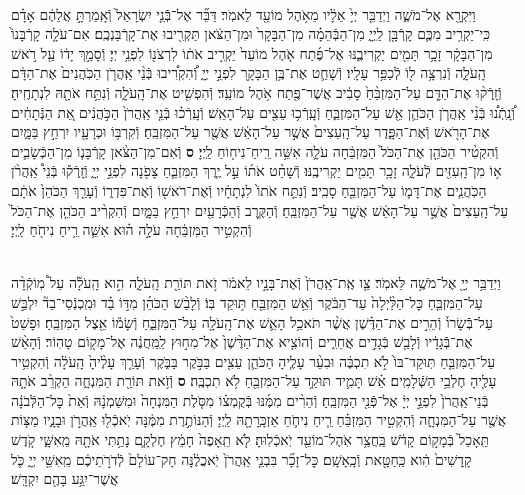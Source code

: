 \documentclass[twoside, openany, parskip=half, 11pt]{book}
\begin{document}
\begin{footnotesize}
\begin{multicols}{2}
\\
וַיִּקְרָ֖א אֶל־מֹשֶׁ֑ה וַיְדַבֵּ֤ר יְיָ֙ אֵלָ֔יו מֵאֹ֥הֶל מוֹעֵ֖ד לֵאמֹֽר׃ דַּבֵּ֞ר אֶל־בְּֿֿנֵ֤י יִשְׂרָאֵל֙ וְֿאָֽמַרְתָּ֣ אֲלֵהֶ֔ם אָדָ֗ם כִּֽי־יַקְרִ֥יב מִכֶּ֛ם קָרְֿבָּ֖ן לַֽיְיָ֑ מִן־הַבְּֿהֵמָ֗ה מִן־הַבָּקָר֙ וּמִן־הַצֹּ֔אן תַּקְרִ֖יבוּ אֶת־קָרְֿבַּנְכֶֽם׃ אִם־עֹלָ֤ה קָרְֿבָּנוֹ֙ מִן־הַבָּקָ֔ר זָכָ֥ר תָּמִ֖ים יַקְרִיבֶ֑נּוּ אֶל־פֶּ֜תַח אֹ֤הֶל מוֹעֵד֙ יַקְרִ֣יב אֹת֔וֹ לִרְצֹנ֖וֹ לִפְנֵ֥י יְיָ׃
וְֿסָמַ֣ךְ יָד֔וֹ עַ֖ל רֹ֣אשׁ הָֽעֹלָ֑ה וְֿנִרְצָ֥ה ל֖וֹ לְֿכַפֵּ֥ר עָלָֽיו׃
וְֿשָׁחַ֛ט אֶת־בֶּ֥ן הַבָּקָ֖ר לִפְנֵ֣י יְיָ֑ וְֿ֠הִקְרִ֠יבוּ בְּֿנֵ֨י אַֽהֲרֹ֤ן הַכֹּֽהֲנִים֙ אֶת־הַדָּ֔ם וְֿזָֽרְֿק֨וּ אֶת־הַדָּ֤ם עַל־הַמִּזְבֵּ֨חַ֙ סָבִ֔יב אֲשֶׁר־פֶּ֖תַח אֹ֥הֶל מוֹעֵֽד׃ וְֿהִפְשִׁ֖יט אֶת־הָֽעֹלָ֑ה וְֿנִתַּ֥ח אֹתָ֖הּ לִנְתָחֶֽיהָ׃ וְֿ֠נָֽתְֿנ֠וּ בְּֿנֵ֨י אַֽהֲרֹ֧ן הַכֹּהֵ֛ן אֵ֖שׁ עַל־הַמִּזְבֵּ֑חַ וְֿעָֽרְֿכ֥וּ עֵצִ֖ים עַל־הָאֵֽשׁ׃ וְֿעָֽרְֿכ֗וּ בְּֿנֵ֤י אַֽהֲרֹן֙ הַכֹּ֣הֲנִ֔ים אֵ֚ת הַנְּֿתָחִ֔ים אֶת־הָרֹ֖אשׁ וְֿאֶת־הַפָּ֑דֶר עַל־הָֽעֵצִים֙ אֲשֶׁ֣ר עַל־הָאֵ֔שׁ אֲשֶׁ֖ר עַל־הַמִּזְבֵּֽחַ׃ וְֿקִרְבּ֥וֹ וּכְרָעָ֖יו יִרְחַ֣ץ בַּמָּ֑יִם וְֿהִקְטִ֨יר הַכֹּהֵ֤ן אֶת־הַכֹּל֙ הַמִּזְבֵּ֔חָה עֹלָ֛ה אִשֵּׁ֥ה רֵֽיחַ־נִיח֖וֹחַ לַֽיְיָ׃ \textbf{ס}  וְֿאִם־מִן־הַצֹּ֨אן קָרְֿבָּנ֧וֹ מִן־הַכְּֿשָׂבִ֛ים א֥וֹ מִן־הָֽעִזִּ֖ים לְֿעֹלָ֑ה זָכָ֥ר תָּמִ֖ים יַקְרִיבֶֽנּוּ׃ וְֿשָׁחַ֨ט אֹת֜וֹ עַ֣ל יֶ֧רֶךְ הַמִּזְבֵּ֛חַ צָפֹ֖נָה לִפְנֵ֣י יְיָ֑ וְֿזָֽרְֿק֡וּ בְּֿנֵי֩ אַֽהֲרֹ֨ן הַכֹּֽהֲנִ֧ים אֶת־דָּמ֛וֹ עַל־הַמִּזְבֵּ֖חַ סָבִֽיב׃ וְֿנִתַּ֤ח אֹתוֹ֙ לִנְתָחָ֔יו וְֿאֶת־רֹאשׁ֖וֹ וְֿאֶת־פִּדְר֑וֹ וְֿעָרַ֤ךְ הַכֹּהֵן֙ אֹתָ֔ם עַל־הָֽעֵצִים֙ אֲשֶׁ֣ר עַל־הָאֵ֔שׁ אֲשֶׁ֖ר עַל־הַמִּזְבֵּֽחַ׃ וְֿהַקֶּ֥רֶב וְֿהַכְּֿרָעַ֖יִם יִרְחַ֣ץ בַּמָּ֑יִם וְֿהִקְרִ֨יב הַכֹּהֵ֤ן אֶת־הַכֹּל֙ וְֿהִקְטִ֣יר הַמִּזְבֵּ֔חָה עֹלָ֣ה ה֗וּא אִשֵּׁ֛ה רֵ֥יחַ נִיחֹ֖חַ לַֽיְיָ׃

\\
וַיְדַבֵּ֥ר יְיָ֖ אֶל־מֹשֶׁ֥ה לֵּאמֹֽר׃ צַ֤ו אֶֽת־אַֽהֲרֹן֙ וְֿאֶת־בָּנָ֣יו לֵאמֹ֔ר זֹ֥את תּוֹרַ֖ת הָֽעֹלָ֑ה הִ֣וא הָֽעֹלָ֡ה עַל֩ מֽוֹקְֿדָ֨ה עַל־הַמִּזְבֵּ֤חַ כׇּל־הַלַּ֨יְלָה֙ עַד־הַבֹּ֔קֶר וְֿאֵ֥שׁ הַמִּזְבֵּ֖חַ תּ֥וּקַד בּֽוֹ׃ וְֿלָבַ֨שׁ הַכֹּהֵ֜ן מִדּ֣וֹ בַ֗ד וּמִֽכְנְֿסֵי־בַד֘ יִלְבַּ֣שׁ עַל־בְּֿֿשָׂרוֹ֒ וְֿהֵרִ֣ים אֶת־הַדֶּ֗שֶׁן אֲשֶׁ֨ר תֹּאכַ֥ל הָאֵ֛שׁ אֶת־הָֽעֹלָ֖ה עַל־הַמִּזְבֵּ֑חַ וְֿשָׂמ֕וֹ אֵ֖צֶל הַמִּזְבֵּֽחַ׃  וּפָשַׁט֙ אֶת־בְּֿֿגָדָ֔יו וְֿלָבַ֖שׁ בְּֿגָדִ֣ים אֲחֵרִ֑ים וְֿהוֹצִ֤יא אֶת־הַדֶּ֨שֶׁן֙ אֶל־מִח֣וּץ לַֽמַּֽחֲנֶ֔ה אֶל־מָק֖וֹם טָהֽוֹר׃ וְֿהָאֵ֨שׁ עַל־הַמִּזְבֵּ֤חַ תּֽוּקַד־בּוֹ֙ לֹ֣א תִכְבֶּ֔ה וּבִעֵ֨ר עָלֶ֧יהָ הַכֹּהֵ֛ן עֵצִ֖ים בַּבֹּ֣קֶר בַּבֹּ֑קֶר וְֿעָרַ֤ךְ עָלֶ֨יהָ֙ הָֽעֹלָ֔ה וְֿהִקְטִ֥יר עָלֶ֖יהָ חֶלְבֵ֥י הַשְּֿׁלָמִֽים׃ אֵ֗שׁ תָּמִ֛יד תּוּקַ֥ד עַל־הַמִּזְבֵּ֖חַ לֹ֥א תִכְבֶּֽה׃ \textbf{ס}  וְֿזֹ֥את תּוֹרַ֖ת הַמִּנְחָ֑ה הַקְרֵ֨ב אֹתָ֤הּ בְּֿנֵי־אַֽהֲרֹן֙ לִפְנֵ֣י יְיָ֔ אֶל־פְּֿֿנֵ֖י הַמִּזְבֵּֽחַ׃ וְֿהֵרִ֨ים מִמֶּ֜נּוּ בְּֿקֻמְצ֗וֹ מִסֹּ֤לֶת הַמִּנְחָה֙ וּמִשַּׁמְנָ֔הּ וְֿאֵת֙ כׇּל־הַלְּֿבֹנָ֔ה אֲשֶׁ֖ר עַל־הַמִּנְחָ֑ה וְֿהִקְטִ֣יר הַמִּזְבֵּ֗חַ רֵ֧יחַ נִיחֹ֛חַ אַזְכָּֽרָתָ֖הּ לַֽיְיָ׃ וְֿהַנּוֹתֶ֣רֶת מִמֶּ֔נָּה יֹֽאכְֿל֖וּ אַֽהֲרֹ֣ן וּבָנָ֑יו מַצּ֤וֹת תֵּֽאָכֵל֙ בְּֿמָק֣וֹם קָדֹ֔שׁ בַּֽחֲצַ֥ר אֹֽהֶל־מוֹעֵ֖ד יֹֽאכְֿלֽוּהָ׃ לֹ֤א תֵֽאָפֶה֙ חָמֵ֔ץ חֶלְקָ֛ם נָתַ֥תִּי אֹתָ֖הּ מֵֽאִשָּׁ֑י קֹ֤דֶשׁ קָֽדָשִׁים֙ הִ֔וא כַּֽחַטָּ֖את וְֿכָֽאָשָֽׁם׃ כׇּל־זָכָ֞ר בִּבְנֵ֤י אַֽהֲרֹן֙ יֹֽאכֲלֶ֔נָּה חָק־עוֹלָם֙ לְֿדֹרֹ֣תֵיכֶ֔ם מֵֽאִשֵּׁ֖י יְיָ֑ כֹּ֛ל אֲשֶׁר־יִגַּ֥ע בָּהֶ֖ם יִקְדָּֽשׁ׃


\end{multicols}
\end{footnotesize}
\end{document}
